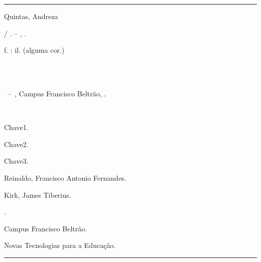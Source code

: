 \documentclass[12pt,a4paper]{abntex2}
\def \discentenome{Andreza}
\def \discentesobrenome{Quintas}
\def \titulotrabalho{Novas Tecnologias para a Educação}
\def \palavraschavea{Chave1}
\def \palavraschaveb{Chave2}
\def \palavraschavec{Chave3}
\def \proforientadornome{Francisco Antonio Fernandes}
\def \proforientadorsobrenome{Reinaldo}
\def \profcoorientadornome{James Tiberius}
\def \profcoorientadorsobrenome{Kirk}
\def \campus{Campus Francisco Beltrão}
\begin{document}

\begin{fichacatalografica}
	\sffamily
	\vspace*{\fill}					%
	\hrule							%
	\begin{center}					%
	\begin{minipage}[c]{12.5cm}		%
	
	\discentesobrenome, \discentenome%
	
	\hspace{0.5cm} \imprimirtitulo  / \imprimirautor. --
	\imprimirlocal, \imprimirdata.
	
	\hspace{0.5cm} \pageref{LastPage} f. : il. (alguma cor.)\\
	
	\hspace{0.5cm} \imprimirorientadorRotulo~\imprimirorientador
    
    \hspace{0.5cm} \imprimircoorientadorRotulo~\imprimircoorientador\\
	
	\hspace{0.5cm}
	\parbox[t]{\textwidth}{\imprimirtipotrabalho~--~\imprimirinstituicao, \campus, \imprimirdata.}\\[1em]
	
	\hspace{0.5cm}
	\begin{inparaenum}[1.]
		\item \palavraschavea.
		\item \palavraschaveb.
		\item \palavraschavec.
	\end{inparaenum}
	\begin{inparaenum}[I.]
		\item \proforientadorsobrenome, \proforientadornome.
		\item \profcoorientadorsobrenome, \profcoorientadornome.
		\item \imprimirinstituicao.
		\item \campus.
		\item \titulotrabalho.\\
	\end{inparaenum}
	\end{minipage}
	\end{center}
	\hrule
\end{fichacatalografica}
\end{document}
